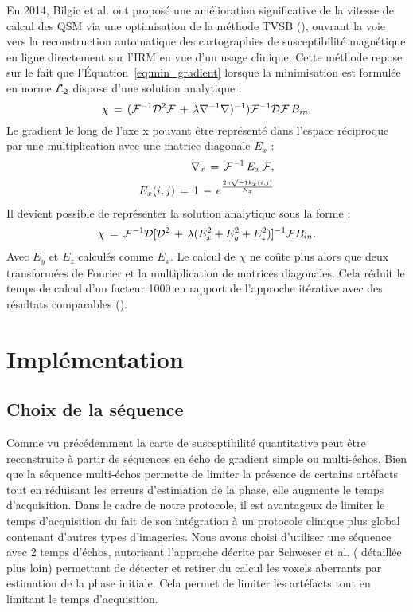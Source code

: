 {En 2014, Bilgic et al. ont proposé une amélioration significative de la vitesse de calcul des QSM
via une optimisation de la méthode TVSB (\cite{Bilgic2013}), ouvrant la voie vers la reconstruction automatique des
cartographies de susceptibilité magnétique en ligne directement sur l’IRM en vue d’un usage clinique.
Cette méthode repose sur le fait que l’Équation~\ref{eq:min_gradient} lorsque la minimisation est formulée en norme ${\cal L}_2$
dispose d’une solution analytique :
\begin{equation}
\label{eq:bilgicanal}
\chi\,= \,({\cal F}^{-1}{\cal D}^{2}{\cal F}\,+\,\lambda\nabla^{-1}\nabla)^{-1}){\cal F}^{-1}{\cal D}{\cal F}\,B_{in}.
\end{equation}
Le gradient le long de l’axe x pouvant être représenté dans l’espace réciproque par une multiplication
avec une matrice diagonale $E_x$ :
\begin{eqnarray}
\nabla_x\,=\,{\cal F}^{-1}\,E_x\,{\cal F},\\
E_x(i,j)\,=\,1\,-\,e^{\frac{2\pi\sqrt{-1}k_x(i,j)}{N_x}}
\end{eqnarray}
Il devient possible de représenter la solution analytique sous la forme :
\begin{equation}
\chi\,=\,{\cal F}^{-1}{\cal D}[{\cal D}^2\,+\,\lambda(E_x^2+E_y^2+E_z^2)]^{-1}{\cal F}B_{in}.
\end{equation}
Avec $E_y$ et $E_z$ calculés comme $E_x$. Le calcul de $\chi$ ne coûte plus alors que deux transformées de Fourier et la multiplication de matrices
diagonales. Cela réduit le temps de calcul d’un facteur 1000 en rapport de l’approche itérative avec
des résultats comparables (\cite{Bilgic2013}).
\section{Implémentation}
\subsection{Choix de la séquence}
Comme vu précédemment la carte de susceptibilité quantitative peut être reconstruite à partir
de séquences en écho de gradient simple ou multi-échos. Bien que la séquence multi-échos permette
de limiter la présence de certains artéfacts tout en réduisant les erreurs d’estimation de la phase, elle
augmente le temps d’acquisition. Dans le cadre de notre protocole, il est avantageux de limiter le
temps d’acquisition du fait de son intégration à un protocole clinique plus global contenant d’autres
types d’imageries. Nous avons choisi d’utiliser une séquence avec 2 temps d’échos, autorisant
l’approche décrite par Schweser et al. (\cite{Schweser2011} détaillée plus loin) permettant de détecter et retirer du
calcul les voxels aberrants par estimation de la phase initiale. Cela permet de limiter les artéfacts tout
en limitant le temps d’acquisition.

}
